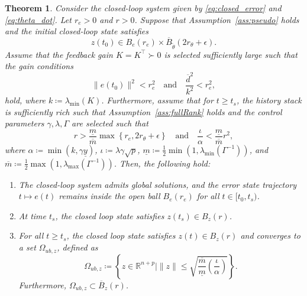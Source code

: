 \documentclass[conference]{ieeeconf}
\newtheorem{theorem}{Theorem}
\begin{document}
\begin{theorem}\label{thm:stability}
Consider the closed-loop system given by \eqref{eq:closed_error} and \eqref{eq:theta_dot}. Let $r_e > 0$ and $r > 0$.  Suppose that Assumption~\ref{ass:pseudo} holds and the initial closed-loop state satisfies
\begin{equation}
z(t_0) \in B_{e}(r_{e}) \times \overline{B}_{\tilde{\theta}}(2 r_{\theta} + \epsilon).
\end{equation}
Assume that the feedback gain $K = K^{\top} \succ 0$ is selected sufficiently large such that the gain conditions
\begin{equation}\label{eq:gain_condition_e}
\|e(t_0)\|^2 < r_e^2 \quad \text{and} \quad \frac{\overline{d}^2}{k^2} < r_e^2,
\end{equation}
hold, where $k \coloneqq \lambda_{\min}(K)$. Furthermore, assume that for $t \ge t_{s}$, the history stack is sufficiently rich such that Assumption~\ref{ass:fullRank} holds and the control parameters $\gamma, \lambda, \Gamma$ are selected such that 
\begin{equation}\label{eq:gain_condition_z}
r > \frac{\underline{m}}{\overline{m}}\max\left\{r_e,2 r_{\theta} + \epsilon\right\} \quad \text{and} \quad \frac{\iota}{\alpha} < \frac{\underline{m}}{\overline{m}} r^2,
\end{equation}
where $\alpha \coloneqq \min(k, \gamma \underline{y})$, $\iota \coloneqq \lambda \gamma \sqrt{p} $, $\underline{m} \coloneqq \frac{1}{2}\min(1, \lambda_{\min}(\Gamma^{-1}))$, and $\overline{m} \coloneqq \frac{1}{2}\max(1, \lambda_{\max}(\Gamma^{-1}))$. Then, the following hold:
\begin{enumerate}
    \item  The closed-loop system admits global solutions, and the error state trajectory $t \mapsto e(t)$ remains inside the open ball $B_e(r_e)$ for all $t \in [t_0, t_{s})$.
    \item  At time $t_{s}$, the closed loop state satisfies $z(t_{s}) \in B_z(r)$.
    \item  For all $t \ge t_{s}$, the closed loop state satisfies $z(t) \in B_z(r)$ and converges to a set $\Omega_{ub,z}$, defined as
    \begin{equation}\label{eq:UUB_set}
    \Omega_{ub,z} \coloneqq \left\{ z \in \mathbb{R}^{n+p} \mid \|z\| \le \sqrt{\frac{\overline{m}}{\underline{m}} \left(\frac{\iota}{\alpha} \right)}\right\}.
    \end{equation}
    Furthermore, $\Omega_{ub,z} \subset \overline{B}_{z}(r)$. 
    \end{enumerate}
\end{theorem}
\end{document}
